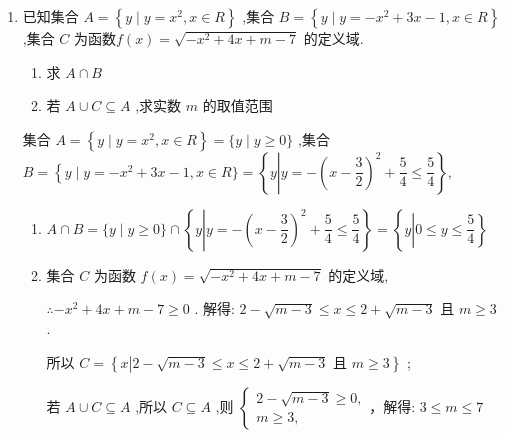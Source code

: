 \begin{enumerate}
    \item 已知集合 $A = \left\{  {y \mid  y = {x}^{2},x \in  R}\right\}$ ,集合 $B = \left\{  {y \mid  y =  - {x}^{2} + {3x} - 1,x \in  R}\right\}$ ,集合 $C$ 为函数$f\left( x\right)  = \sqrt{-{x}^{2} + {4x} + m - 7}$ 的定义域.
    \begin{enumerate}
        \item 求 $A \cap  B$
        \item 若 $A \cup  C \subseteq  A$ ,求实数 $m$ 的取值范围
    \end{enumerate}
    \begin{jieda}
        集合 $A = \left\{  {y \mid  y = {x}^{2},x \in  R}\right\}   = \{ y \mid  y \geq  0\}$ ,集合 $B = \left\{  {y \mid  y =  - {x}^{2} + {3x} - 1}\right.,x \in  R\}  = \left\{  {y\left| {y =  - {\left( x - \dfrac{3}{2}\right) }^{2} + \dfrac{5}{4} \leq  \dfrac{5}{4}}\right. }\right\}  ,$
        \begin{enumerate}
            \item $A \cap  B = \{ y \mid  y \geq  0\}  \cap  \left\{  {y\left| {y =  - {\left( x - \dfrac{3}{2}\right) }^{2} + \dfrac{5}{4} \leq  \dfrac{5}{4}}\right. }\right\}   = \left\{ y \left |  0 \leq  y \leq  \dfrac{5}{4}\right\}\right.$
            \item 集合 $C$ 为函数 $f\left( x\right)  = \sqrt{-{x}^{2} + {4x} + m - 7}$ 的定义域,
            
            $\therefore  - {x}^{2} + {4x} + m - 7 \geq  0$ . 解得: $2 - \sqrt{m - 3} \leq  x \leq  2 + \sqrt{m - 3}$ 且 $m \geq  3$ .
            
            所以 $C = \left\{  {x\left| {2 - \sqrt{m - 3} \leq  x \leq  2 + \sqrt{m - 3}\text{ 且 }m \geq  3}\right. }\right\}$ ;
            
            若 $A \cup  C \subseteq  A$ ,所以 $C \subseteq  A$ ,则 $\left\{  {\begin{array}{l} 2 - \sqrt{m - 3} \geq  0, \\  m \geq  3, \end{array}} \right.$，解得: $3 \leq m \leq  7$
        \end{enumerate}
    \end{jieda}
\end{enumerate}

